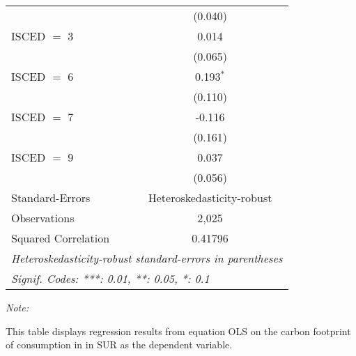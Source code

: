 \begin{table}[htbp!]
\begin{adjustbox}{width = 1\textwidth, max height = 0.95\textheight, center}
\begin{threeparttable}[b]
\begin{tabular}{lc}
                                & (0.040)\\   
            ISCED $=$ 3         & 0.014\\   
                                & (0.065)\\   
            ISCED $=$ 6         & 0.193$^{*}$\\   
                                & (0.110)\\   
            ISCED $=$ 7         & -0.116\\   
                                & (0.161)\\   
            ISCED $=$ 9         & 0.037\\   
                                & (0.056)\\   
            \midrule 
            Standard-Errors     & Heteroskedasticity-robust \\   
            Observations        & 2,025\\  
            Squared Correlation & 0.41796\\  
            \midrule \midrule
            \multicolumn{2}{l}{\emph{Heteroskedasticity-robust standard-errors in parentheses}}\\
            \multicolumn{2}{l}{\emph{Signif. Codes: ***: 0.01, **: 0.05, *: 0.1}}\\
         \end{tabular}
         
         \begin{tablenotes}\item \medskip \textit{Note:}
            \item This table displays regression results from equation OLS on the carbon footprint of consumption in  in SUR as the dependent variable.  
         \end{tablenotes}
      \end{threeparttable}
   \end{adjustbox}
\end{table}


